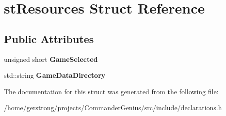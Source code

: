 \hypertarget{structst_resources}{
\section{stResources Struct Reference}
\label{structst_resources}
}
\subsection*{Public Attributes}
\begin{DoxyCompactItemize}
\item 
\hypertarget{structst_resources_a4544c8b0218af2850a0fd3cf144810db}{
unsigned short {\bfseries GameSelected}}
\label{structst_resources_a4544c8b0218af2850a0fd3cf144810db}

\item 
\hypertarget{structst_resources_a23753b3f2dfb6761131a4e401c588477}{
std::string {\bfseries GameDataDirectory}}
\label{structst_resources_a23753b3f2dfb6761131a4e401c588477}

\end{DoxyCompactItemize}


The documentation for this struct was generated from the following file:\begin{DoxyCompactItemize}
\item 
/home/gerstrong/projects/CommanderGenius/src/include/declarations.h\end{DoxyCompactItemize}

